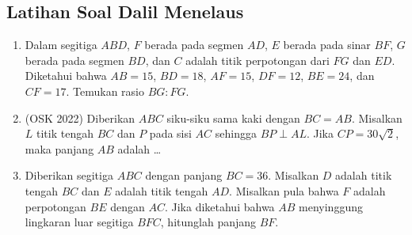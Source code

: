 \subsection{Latihan Soal Dalil Menelaus}
\begin{enumerate}
    \item Dalam segitiga $ABD$, $F$ berada pada segmen $AD$, $E$ berada pada sinar $BF$, $G$ berada pada segmen $BD$, dan $C$ adalah titik perpotongan dari $FG$ dan $ED$. Diketahui bahwa $AB = 15$, $BD = 18$, $AF = 15$, $DF = 12$, $BE = 24$, dan $CF = 17$. Temukan rasio $BG : FG$.

    \item (OSK 2022) Diberikan $ABC$ siku-siku sama kaki dengan $BC=AB$. Misalkan $L$ titik tengah $BC$ dan $P$ pada sisi $AC$ sehingga $BP \perp AL$. Jika $CP=30\sqrt{2}$, maka panjang $AB$ adalah \ldots

    \item Diberikan segitiga $ABC$ dengan panjang $BC = 36$. Misalkan $D$ adalah titik tengah $BC$ dan $E$ adalah titik tengah $AD$. Misalkan pula bahwa $F$ adalah perpotongan $BE$ dengan $AC$. Jika diketahui bahwa $AB$ menyinggung lingkaran luar segitiga $BFC$, hitunglah panjang $BF$.
\end{enumerate}